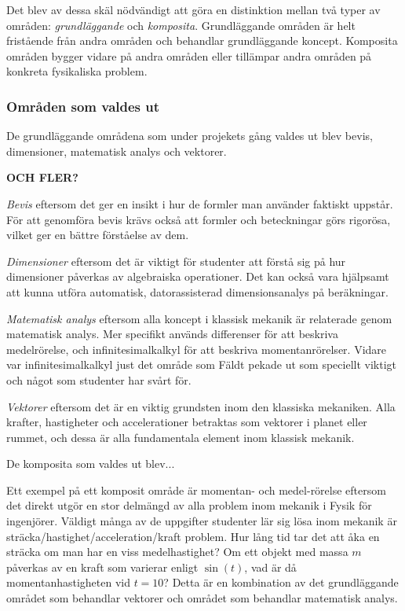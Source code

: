 \begin{draft}
Det blev av dessa skäl nödvändigt att göra en distinktion mellan två typer av områden: \textit{grundläggande} och \textit{komposita}. Grundläggande områden är helt fristående från andra områden och behandlar grundläggande koncept. Komposita områden bygger vidare på andra områden eller tillämpar andra områden på konkreta fysikaliska problem.

\subsubsection*{Områden som valdes ut}

De grundläggande områdena som under projekets gång valdes ut blev bevis, dimensioner, matematisk analys och vektorer. 

\textbf{OCH FLER?}

\textit{Bevis} eftersom det ger en insikt i hur de formler man använder
faktiskt uppstår. För att genomföra bevis krävs också att formler och
beteckningar görs rigorösa, vilket ger en bättre förståelse av dem.

\textit{Dimensioner} eftersom det är viktigt för studenter att förstå sig på
hur dimensioner påverkas av algebraiska operationer. Det kan också vara
hjälpsamt att kunna utföra automatisk, datorassisterad dimensionsanalys på
beräkningar.

\textit{Matematisk analys} eftersom alla koncept i klassisk mekanik är
relaterade genom matematisk analys. Mer specifikt används differenser för att
beskriva medelrörelse, och infinitesimalkalkyl för att beskriva
momentanrörelser. Vidare var infinitesimalkalkyl just det område som Fäldt
pekade ut som speciellt viktigt och något som studenter har svårt för.

\textit{Vektorer} eftersom det är en viktig grundsten inom den klassiska
mekaniken. Alla krafter, hastigheter och accelerationer betraktas som vektorer i
planet eller rummet, och dessa är alla fundamentala element inom klassisk
mekanik.

\end{draft}
\begin{binge}

De komposita som valdes ut blev...

Ett exempel på ett komposit område är momentan- och medel-rörelse eftersom det
direkt utgör en stor delmängd av alla problem inom mekanik i Fysik för
ingenjörer. Väldigt många av de uppgifter studenter lär sig lösa inom mekanik
är sträcka/hastighet/acceleration/kraft problem. Hur lång tid tar det att åka
en sträcka om man har en viss medelhastighet? Om ett objekt med massa $m$
påverkas av en kraft som varierar enligt $\sin(t)$, vad är då
momentanhastigheten vid $t=10$? Detta är en kombination av det grundläggande
området som behandlar vektorer och området som behandlar matematisk analys.

\end{binge}

